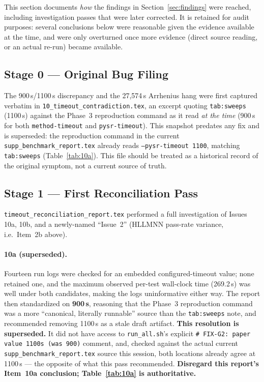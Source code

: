 \documentclass[twoside,11pt]{article}
\newcommand{\HSL}{\textsc{HLLMNN}}
\begin{document}
This section documents \emph{how} the findings in
Section~\ref{sec:findings} were reached, including investigation passes
that were later corrected. It is retained for audit purposes: several
conclusions below were reasonable given the evidence available at the
time, and were only overturned once more evidence (direct source
reading, or an actual re-run) became available.

\subsection{Stage 0 --- Original Bug Filing}

The 900\,s/1100\,s discrepancy and the 27{,}574\,s Arrhenius hang were
first captured verbatim in \texttt{10\_timeout\_contradiction.tex}, an
excerpt quoting \texttt{tab:sweeps} (1100\,s) against the Phase~3
reproduction command as it read \emph{at the time} (900\,s for both
\texttt{method-timeout} and \texttt{pysr-timeout}). This snapshot
predates any fix and is superseded: the reproduction command in the
current \texttt{supp\_benchmark\_report.tex} already reads
\texttt{--pysr-timeout 1100}, matching \texttt{tab:sweeps}
(Table~\ref{tab:10a}). This file should be treated as a historical
record of the original symptom, not a current source of truth.

\subsection{Stage 1 --- First Reconciliation Pass}
\label{sec:history:10a}
\label{sec:history:10b}

\texttt{timeout\_reconciliation\_report.tex} performed a full
investigation of Issues 10a, 10b, and a newly-named ``Issue~2''
(\HSL{} pass-rate variance, i.e.\ Item~2b above).

\paragraph{10a (superseded).} Fourteen run logs were checked for an
embedded configured-timeout value; none retained one, and the maximum
observed per-test wall-clock time (269.2\,s) was well under both
candidates, making the logs uninformative either way. The report then
standardized on \textbf{900\,s}, reasoning that the Phase~3
reproduction command was a more ``canonical, literally runnable''
source than the \texttt{tab:sweeps} note, and recommended removing
1100\,s as a stale draft artifact. \textbf{This resolution is
superseded.} It did not have access to \texttt{run\_all.sh}'s explicit
\texttt{\# FIX-G2: paper value 1100s (was 900)} comment, and, checked
against the actual current \texttt{supp\_benchmark\_report.tex} source
this session, both locations already agree at 1100\,s --- the opposite
of what this pass recommended. \textbf{Disregard this report's Item~10a
conclusion; Table~\ref{tab:10a} is authoritative.}
\end{document}
